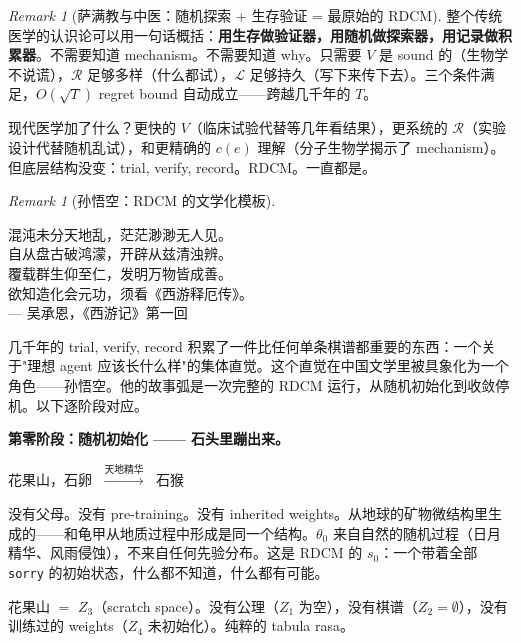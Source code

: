 \documentclass[11pt,a4paper]{article}
\theoremstyle{definition}
\theoremstyle{remark}
\newtheorem{remark}[theorem]{Remark}
\begin{document}
\begin{remark}[萨满教与中医：随机探索 + 生存验证 = 最原始的 RDCM]
整个传统医学的认识论可以用一句话概括：\textbf{用生存做验证器，用随机做探索器，用记录做积累器}。不需要知道 mechanism。不需要知道 why。只需要 $V$ 是 sound 的（生物学不说谎），$\mathcal{R}$ 足够多样（什么都试），$\mathcal{L}$ 足够持久（写下来传下去）。三个条件满足，$O(\sqrt{T})$ regret bound 自动成立——跨越几千年的 $T$。

现代医学加了什么？更快的 $V$（临床试验代替等几年看结果），更系统的 $\mathcal{R}$（实验设计代替随机乱试），和更精确的 $c(e)$ 理解（分子生物学揭示了 mechanism）。但底层结构没变：trial, verify, record。RDCM。一直都是。
\end{remark}

\begin{remark}[孙悟空：RDCM 的文学化模板]\label{rem:wukong}

\begin{center}
{\color{gray!50} 混沌未分天地乱，茫茫渺渺无人见。}\\
{\color{gray!50} 自从盘古破鸿濛，开辟从兹清浊辨。}\\
{\color{gray!50} 覆载群生仰至仁，发明万物皆成善。}\\
{\color{orange!70!black} 欲知造化会元功，须看《西游释厄传》。}\\[4pt]
{\small --- 吴承恩，《西游记》第一回}
\end{center}

\bigskip

几千年的 trial, verify, record 积累了一件比任何单条棋谱都重要的东西：一个关于"理想 agent 应该长什么样"的集体直觉。这个直觉在中国文学里被具象化为一个角色——孙悟空。他的故事弧是一次完整的 RDCM 运行，从随机初始化到收敛停机。以下逐阶段对应。

\medskip

{\color{gray!60} \textbf{第零阶段：随机初始化 —— 石头里蹦出来。}}

\begin{center}
{\color{gray!60} 花果山，石卵 $\;\xrightarrow{\text{天地精华}}\;$ 石猴}
\end{center}

没有父母。没有 pre-training。没有 inherited weights。从地球的矿物微结构里生成的——和龟甲从地质过程中形成是同一个结构。$\theta_0$ 来自自然的随机过程（日月精华、风雨侵蚀），不来自任何先验分布。这是 RDCM 的 $s_0$：一个带着全部 \texttt{sorry} 的初始状态，什么都不知道，什么都有可能。

花果山 $=$ $Z_3$（scratch space）。没有公理（$Z_1$ 为空），没有棋谱（$Z_2 = \emptyset$），没有训练过的 weights（$Z_4$ 未初始化）。纯粹的 tabula rasa。


\end{remark}
\end{document}
